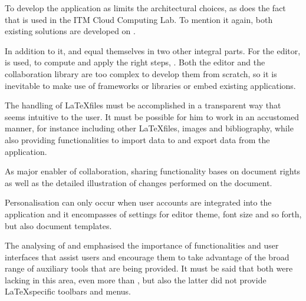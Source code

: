 To develop the application as  limits the architectural choices, as does the fact that  is used in the ITM Cloud Computing Lab. To mention it again, both existing solutions are developed on .

In addition to it,  and  equal themselves in two other integral parts. For the editor,  is used, to compute and apply the right  steps, . Both the editor and the collaboration library are too complex to develop them from scratch, so it is inevitable to make use of frameworks or libraries or embed existing applications.

The handling of \LaTeX files must be accomplished in a transparent way that seems intuitive to the user. It must be possible for him to work in an accustomed manner, for instance including other \LaTeX files, images and bibliography, while also providing functionalities to import data to and export data from the application.

As major enabler of collaboration, sharing functionality bases on document rights as well as the detailed illustration of changes performed on the document.

Personalisation can only occur when user accounts are integrated into the application and it encompasses of settings for editor theme, font size and so forth, but also document templates.

The analysing of  and  emphasised the importance of functionalities and user interfaces that assist users and encourage them to take advantage of the broad range of auxiliary tools that are being provided. It must be said that both were lacking in this area,  even more than , but also the latter did not provide \LaTeX specific toolbars and menus.
